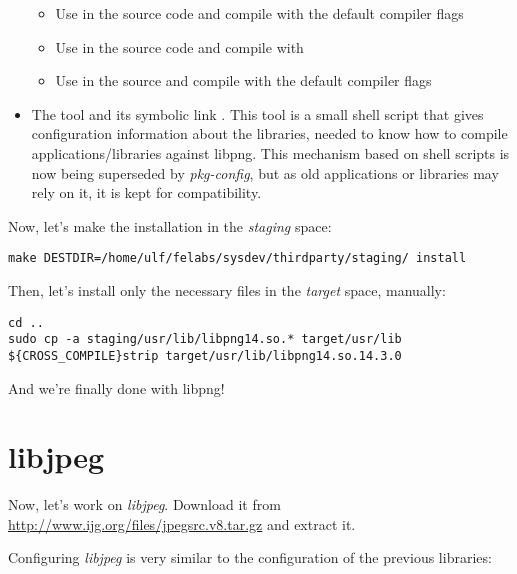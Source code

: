 \begin{itemize}
  \begin{itemize}

  \item Use  in the source code and compile with
    the default compiler flags

  \item Use  in the source code and compile
    with 

  \item Use  in the source and compile
    with the default compiler flags

  \end{itemize}

\item The  tool and its symbolic link
  . This tool is a small shell script
  that gives configuration information about the libraries, needed to
  know how to compile applications/libraries against libpng. This
  mechanism based on shell scripts is now being superseded by {\em
    pkg-config}, but as old applications or libraries may rely on it,
  it is kept for compatibility.

\end{itemize}

Now, let's make the installation in the {\em staging} space:

\begin{verbatim}
make DESTDIR=/home/ulf/felabs/sysdev/thirdparty/staging/ install
\end{verbatim}

Then, let's install only the necessary files in the {\em target}
space, manually:

\begin{verbatim}
cd ..
sudo cp -a staging/usr/lib/libpng14.so.* target/usr/lib
${CROSS_COMPILE}strip target/usr/lib/libpng14.so.14.3.0
\end{verbatim}

And we're finally done with libpng!

\section{libjpeg}

Now, let's work on {\em libjpeg}. Download it from
\url{http://www.ijg.org/files/jpegsrc.v8.tar.gz} and extract it.

Configuring {\em libjpeg} is very similar to the configuration of the
previous libraries:

